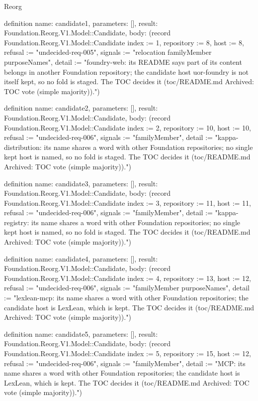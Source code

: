 \begin{lexlean}{Reorg}
\begin{semanticmodule}
definition{
  name: candidate1,
  parameters: [],
  result: Foundation.Reorg.V1.Model::Candidate,
  body: (record Foundation.Reorg.V1.Model::Candidate {index := 1, repository := 8, host := 8, refusal := "undecided-req-005", signals := "relocation familyMember purposeNames", detail := "foundry-web: its README says part of its content belongs in another Foundation repository; the candidate host uor-foundry is not itself kept, so no fold is staged. The TOC decides it (toc/README.md Archived: TOC vote (simple majority))."})
}

definition{
  name: candidate2,
  parameters: [],
  result: Foundation.Reorg.V1.Model::Candidate,
  body: (record Foundation.Reorg.V1.Model::Candidate {index := 2, repository := 10, host := 10, refusal := "undecided-req-006", signals := "familyMember", detail := "kappa-distribution: its name shares a word with other Foundation repositories; no single kept host is named, so no fold is staged. The TOC decides it (toc/README.md Archived: TOC vote (simple majority))."})
}

definition{
  name: candidate3,
  parameters: [],
  result: Foundation.Reorg.V1.Model::Candidate,
  body: (record Foundation.Reorg.V1.Model::Candidate {index := 3, repository := 11, host := 11, refusal := "undecided-req-006", signals := "familyMember", detail := "kappa-registry: its name shares a word with other Foundation repositories; no single kept host is named, so no fold is staged. The TOC decides it (toc/README.md Archived: TOC vote (simple majority))."})
}

definition{
  name: candidate4,
  parameters: [],
  result: Foundation.Reorg.V1.Model::Candidate,
  body: (record Foundation.Reorg.V1.Model::Candidate {index := 4, repository := 13, host := 12, refusal := "undecided-req-006", signals := "familyMember purposeNames", detail := "lexlean-mcp: its name shares a word with other Foundation repositories; the candidate host is LexLean, which is kept. The TOC decides it (toc/README.md Archived: TOC vote (simple majority))."})
}

definition{
  name: candidate5,
  parameters: [],
  result: Foundation.Reorg.V1.Model::Candidate,
  body: (record Foundation.Reorg.V1.Model::Candidate {index := 5, repository := 15, host := 12, refusal := "undecided-req-006", signals := "familyMember", detail := "MCP: its name shares a word with other Foundation repositories; the candidate host is LexLean, which is kept. The TOC decides it (toc/README.md Archived: TOC vote (simple majority))."})
}


\end{semanticmodule}
\end{lexlean}
